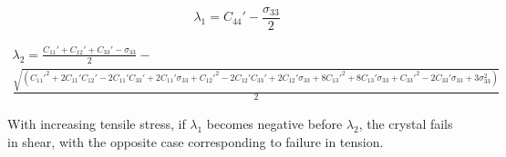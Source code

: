 \documentclass[showpacs,aps,floatfix,prb,reprint,superscriptaddress]{revtex4-1}
\begin{document}
\begin{equation}
\label{eqn:Wallace3} 
\lambda_{1} = C_{44}' - \frac{\sigma_{33}}{2} 
\end{equation}
\begin{widetext}
\begin{multline}
\label{eqn:Wallace4}
\lambda_{2} =  \frac{C_{11}' + C_{12}' + C_{33}' - \sigma_{33}}{2} - \\ \frac{\sqrt{(C_{11}'^2 + 2C_{11}'C_{12}' - 2C_{11}'C_{33}' + 2C_{11}'\sigma_{33} +  C_{12}'^2 - 2C_{12}'C_{33}' + 2C_{12}'\sigma_{33} + 8C_{13}'^2 + 8C_{13}'\sigma_{33} + C_{33}'^2 - 2C_{33}'\sigma_{33} + 3\sigma_{33}^2)}}{2}
\end{multline}
\end{widetext}
With increasing tensile stress, if $\lambda_{1}$ becomes negative before $\lambda_{2}$, the crystal fails in shear, with the opposite case corresponding to failure in tension.
\end{document}

